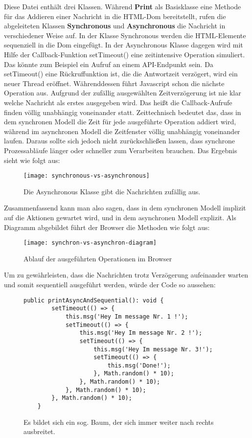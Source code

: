 \noindent
Diese Datei enthält drei Klassen. Während \textbf{Print} als Basisklasse eine Methode für das Addieren einer Nachricht in die HTML-Dom bereitstellt, rufen die abgeleiteten Klassen \textbf{Synchronous} und \textbf{Asynchronous} die Nachricht in verschiedener Weise auf. In der Klasse Synchronous werden die HTML-Elemente sequenziell in die Dom eingefügt. In der Asynchronous Klasse dagegen wird mit Hilfe der Callback-Funktion setTimeout() eine zeitintensive Operation simuliert. Das könnte zum Beispiel ein Aufruf an einem API-Endpunkt sein. Da setTimeout() eine Rückruffunktion ist, die die Antwortzeit verzögert, wird ein neuer Thread eröffnet. Währenddessen führt Javascript schon die nächste Operation aus. Aufgrund der zufällig ausgewählten Zeitverzögerung ist nie klar welche Nachricht als erstes ausgegeben wird. Das heißt die Callback-Aufrufe finden völlig unabhängig voneinander statt. Zeittechnisch bedeutet das, dass in dem synchronen Modell die Zeit für jede ausgeführte Operation addiert wird, während im asynchronen Modell die Zeitfenster völlig unabhängig voneinander laufen. Daraus sollte sich jedoch nicht zurückschließen lassen, dass synchrone Prozessabläufe länger oder schneller zum Verarbeiten brauchen.
Das Ergebnis sieht wie folgt aus:

\begin{figure}[H]
\centering
\texttt{[image: synchronous-vs-asynchronous]}
\caption{Die Asynchronous Klasse gibt die Nachrichten zufällig aus.}
\end{figure}

\noindent
Zusammenfassend kann man also sagen, dass in dem synchronen Modell implizit auf die Aktionen gewartet wird, und in dem asynchronen Modell explizit. Als Diagramm abgebildet führt der Browser die Methoden wie folgt aus:

\begin{center}
\begin{figure}[H]
\texttt{[image: synchron-vs-asynchron-diagram]}
\caption{Ablauf der ausgeführten Operationen im Browser}
\end{figure}
\end{center}

\noindent
Um zu gewährleisten, dass die Nachrichten trotz Verzögerung aufeinander warten und somit sequentiell ausgeführt werden, würde der Code so aussehen:

\begin{figure}[H]
\begin{lstlisting}[basicstyle=\small]
    public printAsyncAndSequential(): void {
        setTimeout(() => {
            this.msg('Hey Im message Nr. 1 !');
            setTimeout(() => {
                this.msg('Hey Im message Nr. 2 !');
                setTimeout(() => {
                    this.msg('Hey Im message Nr. 3!');
                    setTimeout(() => {
                        this.msg('Done!');
                    }, Math.random() * 10);
                }, Math.random() * 10);
            }, Math.random() * 10);
        }, Math.random() * 10);
    }
\end{lstlisting}
\caption{Es bildet sich ein sog. Baum, der sich immer weiter nach rechts ausbreitet.}
\end{figure}

